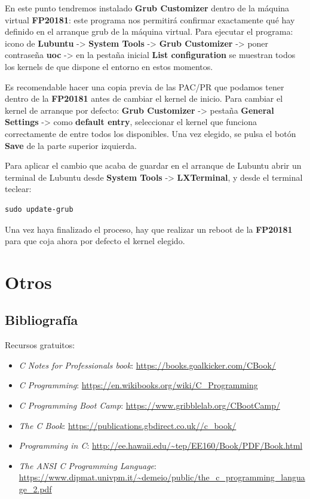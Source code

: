 \documentclass[
]{book}
\providecommand{\tightlist}{%
  \setlength{\itemsep}{0pt}\setlength{\parskip}{0pt}}
\begin{document}
En este punto tendremos instalado \textbf{Grub Customizer} dentro de la máquina virtual \textbf{FP20181}: este programa nos permitirá confirmar exactamente qué hay definido en el arranque grub de la máquina virtual. Para ejecutar el programa: icono de \textbf{Lubuntu} -\textgreater{} \textbf{System Tools} -\textgreater{} \textbf{Grub Customizer} -\textgreater{} poner contraseña \textbf{uoc} -\textgreater{} en la pestaña inicial \textbf{List configuration} se muestran todos los kernels de que dispone el entorno en estos momentos.

Es recomendable hacer una copia previa de las PAC/PR que podamos tener dentro de la \textbf{FP20181} antes de cambiar el kernel de inicio. Para cambiar el kernel de arranque por defecto: \textbf{Grub Customizer} -\textgreater{} pestaña \textbf{General Settings} -\textgreater{} como \textbf{default entry}, seleccionar el kernel que funciona correctamente de entre todos los disponibles. Una vez elegido, se pulsa el botón \textbf{Save} de la parte superior izquierda.

Para aplicar el cambio que acaba de guardar en el arranque de Lubuntu abrir un terminal de Lubuntu desde \textbf{System Tools} -\textgreater{} \textbf{LXTerminal}, y desde el terminal teclear:

\begin{verbatim}
sudo update-grub
\end{verbatim}

Una vez haya finalizado el proceso, hay que realizar un reboot de la \textbf{FP20181} para que coja ahora por defecto el kernel elegido.

\hypertarget{otros}{%
\chapter{Otros}\label{otros}}

\hypertarget{bibliografuxeda}{%
\section{Bibliografía}\label{bibliografuxeda}}

Recursos gratuitos:

\begin{itemize}
\tightlist
\item
  \emph{C Notes for Professionals book}: \url{https://books.goalkicker.com/CBook/}
\item
  \emph{C Programming}: \url{https://en.wikibooks.org/wiki/C_Programming}
\item
  \emph{C Programming Boot Camp}: \url{https://www.gribblelab.org/CBootCamp/}
\item
  \emph{The C Book}: \url{https://publications.gbdirect.co.uk//c_book/}
\item
  \emph{Programming in C}: \url{http://ee.hawaii.edu/~tep/EE160/Book/PDF/Book.html}
\item
  \emph{The ANSI C Programming Language}: \url{https://www.dipmat.univpm.it/~demeio/public/the_c_programming_language_2.pdf}
\end{itemize}

\backmatter
  
\end{document}
